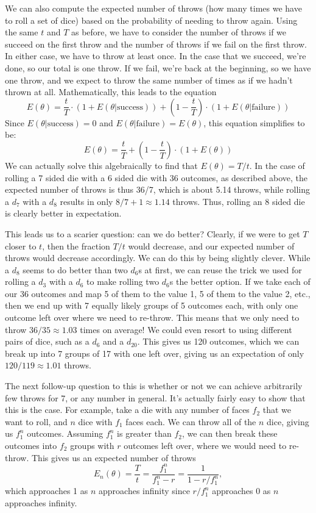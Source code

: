 \documentclass{article}
\begin{document}
\par We can also compute the expected number of throws (how many times we have to roll a set of dice) based on the probability of needing to throw again.
Using the same $t$ and $T$ as before, we have to consider the number of throws if we succeed on the first throw and the number of throws if we fail on the first throw.
In either case, we have to throw at least once. 
In the case that we succeed, we're done, so our total is one throw.
If we fail, we're back at the beginning, so we have one throw, and we expect to throw the same number of times as if we hadn't thrown at all.
Mathematically, this leads to the equation $$E(\theta) = \frac{t}{T} \cdot (1 + E(\theta | \text{success})) + \left(1 -\frac{t}{T} \right) \cdot (1 + E(\theta | \text{failure}))$$
Since $E(\theta | \text{success}) = 0$ and $E(\theta | \text{failure}) = E(\theta)$, this equation simplifies to be: $$E(\theta) = \frac{t}{T} + \left(1 - \frac{t}{T} \right) \cdot (1 + E(\theta))$$
We can actually solve this algebraically to find that $E(\theta) = T/t$. 
In the case of rolling a 7 sided die with a 6 sided die with 36 outcomes, as described above, the expected number of throws is thus 36/7, which is about 5.14 throws, while rolling a $d_7$ with a $d_8$ results in only $8/7 + 1 \approx 1.14$ throws.
Thus, rolling an 8 sided die is clearly better in expectation.

\par This leads us to a scarier question: can we do better?
Clearly, if we were to get $T$ closer to $t$, then the fraction $T/t$ would decrease, and our expected number of throws would decrease accordingly. 
We can do this by being slightly clever.
While a $d_8$ seems to do better than two $d_6$s at first, we can reuse the trick we used for rolling a $d_3$ with a $d_6$ to make rolling two $d_6$s the better option.
If we take each of our 36 outcomes and map 5 of them to the value 1, 5 of them to the value 2, etc., then we end up with 7 equally likely groups of 5 outcomes each, with only one outcome left over where we need to re-throw.
This means that we only need to throw $36/35 \approx 1.03$ times on average! 
We could even resort to using different pairs of dice, such as a $d_6$ and a $d_{20}$.
This gives us 120 outcomes, which we can break up into 7 groups of 17 with one left over, giving us an expectation of only $120/119 \approx 1.01$ throws.

\par The next follow-up question to this is whether or not we can achieve arbitrarily few throws for 7, or any number in general. 
It's actually fairly easy to show that this is the case.
For example, take a die with any number of faces $f_2$ that we want to roll, and $n$ dice with $f_1$ faces each.
We can throw all of the $n$ dice, giving us $f_1^n$ outcomes.
Assuming $f_1^n$ is greater than $f_2$, we can then break these outcomes into $f_2$ groups with $r$ outcomes left over, where we would need to re-throw.
This gives us an expected number of throws $$E_n(\theta) = \frac{T}{t} = \frac{f_1^n}{f_1^n - r} = \frac{1}{1 - r/f_1^n},$$ which approaches 1 as $n$ approaches infinity since $r/f_1^n$ approaches 0 as $n$ approaches infinity.
\end{document}
